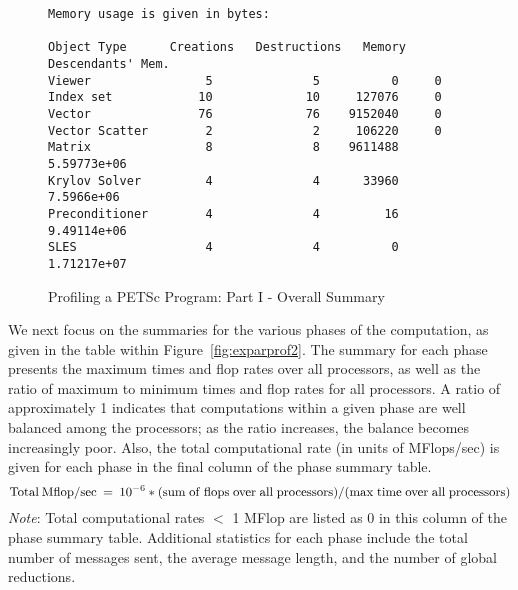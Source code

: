 \begin{figure}[tb]
{\begin{verbatim}
Memory usage is given in bytes:

Object Type      Creations   Destructions   Memory  Descendants' Mem.
Viewer                5              5          0     0
Index set            10             10     127076     0
Vector               76             76    9152040     0
Vector Scatter        2              2     106220     0
Matrix                8              8    9611488     5.59773e+06
Krylov Solver         4              4      33960     7.5966e+06
Preconditioner        4              4         16     9.49114e+06
SLES                  4              4          0     1.71217e+07
\end{verbatim}
}
\caption{Profiling a PETSc Program: Part I - Overall Summary}
\label{fig:exparprof}
\end{figure}

We next focus on the summaries for the various phases of the
computation, as given in the table within Figure~\ref{fig:exparprof2}.  The summary for
each phase presents the maximum times and flop rates over all
processors, as well as the ratio of maximum to minimum times and flop
rates for all processors.  A ratio of approximately 1 indicates that
computations within a given phase are well balanced among the
processors; as the ratio increases, the balance becomes increasingly
poor.  Also, the total computational rate (in units of MFlops/sec) is
given for each phase in the final column of the phase summary table.
\[
   {\rm Total\: Mflop/sec} \:=\: 10^{-6} * ({\rm sum\; of\; flops\; over\; all\; processors})/({\rm max\; time\; over\; all\; processors})
\]
{\em Note}: Total computational rates $<$ 1 MFlop are listed as 0 in this column
of the phase summary table.
Additional statistics for each phase include the total number of messages sent,
the average message length, and the number of global reductions.

